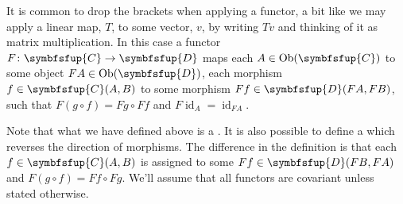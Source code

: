 \documentclass[fleqn]{NotesClass}
\newcommand{\cat}[1]{\symbfsfup{#1}}
\DeclareMathOperator{\Ob}{Ob}
\DeclareMathOperator{\id}{id}
\begin{document}
    \begin{ntn}{}{}
        It is common to drop the brackets when applying a functor, a bit like we may apply a linear map, \(T\), to some vector, \(v\), by writing \(Tv\) and thinking of it as matrix multiplication.
        In this case a functor \(F \colon \cat{C} \to \cat{D}\) maps each \(A \in \Ob(\cat{C})\) to some object \(FA \in \Ob(\cat{D})\), each morphism \(f \in \cat{C}(A, B)\) to some morphism \(Ff \in \cat{D}(FA, FB)\), such that \(F(g \circ f) = Fg \circ Ff\) and \(F\id_A = \id_{FA}\).
    \end{ntn}
    
    Note that what we have defined above is a .
    It is also possible to define a  which reverses the direction of morphisms.
    The difference in the definition is that each \(f \in \cat{C}(A, B)\) is assigned to some \(Ff \in \cat{D}(FB, FA)\) and \(F(g \circ f) = Ff \circ Fg\).
    We'll assume that all functors are covariant unless stated otherwise.
    
\end{document}
